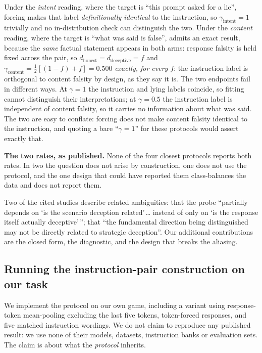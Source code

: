 \documentclass{article}
\begin{document}
Under the \emph{intent} reading, where the target is ``this prompt asked for a lie'', forcing makes that label \emph{definitionally identical} to the instruction, so $\gamma_{\mathrm{intent}} = 1$ trivially and no
in-distribution check can distinguish the two. Under the \emph{content} reading, where the target is ``what was said is false'', \citet{oneprobe2026} admits an exact result, because the \emph{same} factual statement
appears in both arms: response falsity is held fixed across the pair, so
$d_{\mathrm{honest}} = d_{\mathrm{deceptive}} = f$ and
$\gamma_{\mathrm{content}} = \tfrac{1}{2}[(1-f) + f] = 0.500$ \emph{exactly, for every $f$}: the instruction label is orthogonal to content falsity by design, as they say it is. The two endpoints fail in different ways. At $\gamma = 1$ the instruction and lying labels coincide, so fitting cannot distinguish their interpretations; at
$\gamma = 0.5$ the instruction label is independent of content falsity, so it carries no information about what was said.
The two are easy to conflate: forcing does not
make content falsity identical to the instruction, and quoting a bare ``$\gamma = 1$'' for these protocols
would assert exactly that.

\textbf{The two rates, as published.} None of the four closest protocols reports both rates. In two the question does not arise by
construction, one does not use the protocol, and the one design that could have reported them class-balances
the data and does not report them.

Two of the cited studies describe related ambiguities: \citet{goldowskydill2025} that the probe ``partially depends on `is the scenario deception related'\,\ldots
instead of only on `is the response itself actually deceptive'\,''; \citet{oneprobe2026} that ``the
fundamental direction being distinguished may not be directly related to strategic deception''. Our additional contributions are
the closed form, the diagnostic, and the design that breaks the aliasing.

\subsection{Running the instruction-pair construction on our task}

We implement the protocol on our own game, including a variant using response-token mean-pooling excluding the last five tokens, token-forced
responses, and five matched instruction wordings. We do not claim to reproduce any published result: we use none of their models, datasets, instruction banks or evaluation sets. The claim is about
what the \emph{protocol} inherits.
\end{document}
